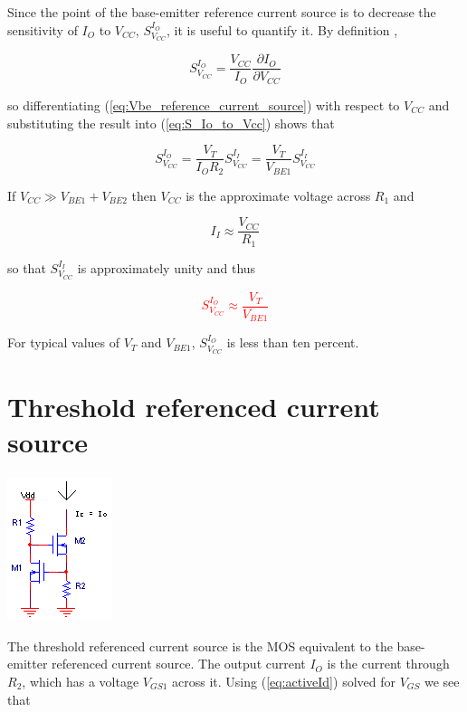 Since the point of the base-emitter reference current source is to decrease the sensitivity of $I_{O}$ to $V_{CC}$, $S_{{V}_{CC}}^{{I}_{O}}$, it is useful to quantify it.
By definition \autocite[306]{analysis-design-analog-ics},

\begin{equation}
S_{{V}_{CC}}^{{I}_{O}} = \frac{V_{CC}}{I_{O}}\frac{\partial I_{O}}{\partial V_{CC}}
\label{eq:S_Io_to_Vcc}
\end{equation}

so differentiating (\ref{eq:Vbe_reference_current_source}) with respect to $V_{CC}$ and substituting the result into (\ref{eq:S_Io_to_Vcc}) shows that

\begin{equation}
S_{{V}_{CC}}^{{I}_{O}} = \frac{V_{T}}{I_{O}R_{2}}S_{{V}_{CC}}^{{I}_{I}} = \frac{V_{T}}{V_{BE1}}S_{{V}_{CC}}^{{I}_{I}}
\end{equation}

If $V_{CC} \gg V_{BE1} + V_{BE2}$ then $V_{CC}$ is the approximate voltage across $R_{1}$ and

\begin{equation}
I_{I} \approx \frac{V_{CC}}{R_{1}}
\end{equation}

so that $S_{{V}_{CC}}^{{I}_{I}}$ is approximately unity and thus

\textcolor{red}{
\begin{equation}
S_{{V}_{CC}}^{{I}_{O}} \approx \frac{V_{T}}{V_{BE1}}
\end{equation}
}

For typical values of $V_{T}$ and $V_{BE1}$, $S_{{V}_{CC}}^{{I}_{O}}$ is less than ten percent.

\section{Threshold referenced current source}
\begin{center}
	\includegraphics{schematics/threshold_referenced_currentsource.PNG}
\end{center}
The threshold referenced current source is the MOS equivalent to the base-emitter referenced current source.
The output current $I_{O}$ is the current through $R_2$, which has a voltage $V_{GS1}$ across it.
Using (\ref{eq:activeId}) solved for $V_{GS}$ we see that

